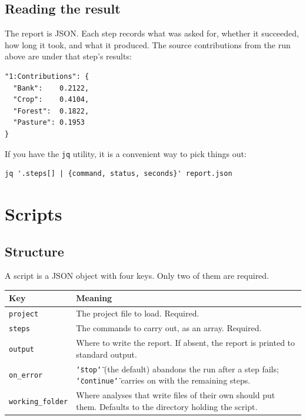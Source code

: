 \documentclass[11pt,a4paper]{report}
\newcommand{\dq}{\char`\"}
\begin{document}
\section{Reading the result}

The report is JSON. Each step records what was asked for, whether it succeeded,
how long it took, and what it produced. The source contributions from the run
above are under that step's results:

\begin{lstlisting}[language=scriptjson]
"1:Contributions": {
  "Bank":    0.2122,
  "Crop":    0.4104,
  "Forest":  0.1822,
  "Pasture": 0.1953
}
\end{lstlisting}

If you have the \texttt{jq} utility, it is a convenient way to pick things out:

\begin{lstlisting}
jq '.steps[] | {command, status, seconds}' report.json
\end{lstlisting}

\chapter{Scripts}
\label{ch:scripts}

\section{Structure}

A script is a JSON object with four keys. Only two of them are required.

\begin{longtable}{@{}p{}p{}@{}}
\toprule
\textbf{Key} & \textbf{Meaning} \\
\midrule
\endfirsthead
\texttt{project} & The project file to load. Required. \\
\addlinespace
\texttt{steps} & The commands to carry out, as an array. Required. \\
\addlinespace
\texttt{output} & Where to write the report. If absent, the report is printed
  to standard output. \\
\addlinespace
\texttt{on\_error} & \texttt{\dq{}stop\dq{}} (the default) abandons the run
  after a step fails; \texttt{\dq{}continue\dq{}} carries on with the
  remaining steps. \\
\addlinespace
\texttt{working\_folder} & Where analyses that write files of their own should
  put them. Defaults to the directory holding the script. \\
\bottomrule
\end{longtable}
\end{document}
